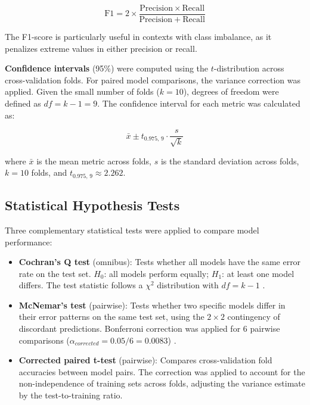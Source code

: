 \documentclass[alpha-refs,english]{RBCA_v3.0}
\begin{document}
\begin{equation}
\mathrm{F1} = 2 \times \frac{\mathrm{Precision} \times \mathrm{Recall}}{\mathrm{Precision} + \mathrm{Recall}}
\label{eq:f1}
\end{equation}

The F1-score is particularly useful in contexts with class imbalance, as it penalizes extreme values in either precision or recall.

\textbf{Confidence intervals} (95\%) were computed using the $t$-distribution across cross-validation folds. For paired model comparisons, the \cite{Nadeau2003} variance correction was applied. Given the small number of folds ($k=10$), degrees of freedom were defined as $df = k - 1 = 9$. The confidence interval for each metric was calculated as:

\begin{equation}
\bar{x} \pm t_{0.975,\,9} \cdot \frac{s}{\sqrt{k}}
\label{eq:ci}
\end{equation}

\noindent where $\bar{x}$ is the mean metric across folds, $s$ is the standard deviation across folds, $k = 10$ folds, and $t_{0.975,\,9} \approx 2.262$.

\subsection{Statistical Hypothesis Tests}
Three complementary statistical tests were applied to compare model performance:

\begin{itemize}
    \item \textbf{Cochran's Q test} (omnibus): Tests whether all models have the same error rate on the test set. $H_0$: all models perform equally; $H_1$: at least one model differs. The test statistic follows a $\chi^2$ distribution with $df = k - 1$ \citep{Cochran1950}.
    \item \textbf{McNemar's test} (pairwise): Tests whether two specific models differ in their error patterns on the same test set, using the $2 \times 2$ contingency of discordant predictions. Bonferroni correction was applied for 6 pairwise comparisons ($\alpha_{corrected} = 0.05/6 = 0.0083$) \citep{McNemar1947}.
    \item \textbf{Corrected paired t-test} (pairwise): Compares cross-validation fold accuracies between model pairs. The \cite{Nadeau2003} correction was applied to account for the non-independence of training sets across folds, adjusting the variance estimate by the test-to-training ratio.
\end{itemize}
\end{document}
